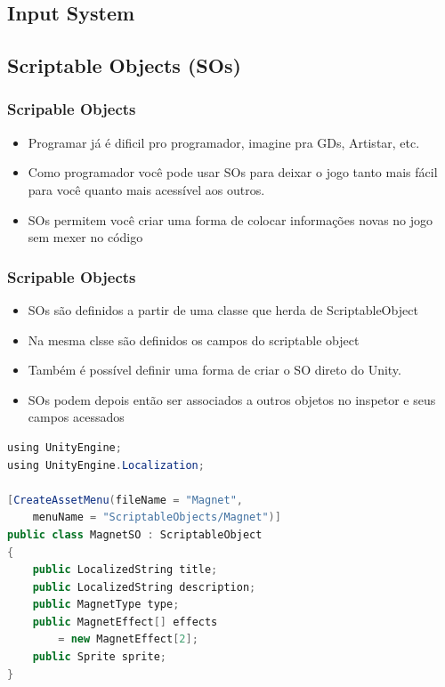 \documentclass{beamer}
\begin{document}
	\subsection{Input System}

	\subsection{Scriptable Objects (SOs)}
	\begin{frame}
		\frametitle{Scripable Objects}

		\begin{itemize}
			\item Programar já é dificil pro programador, imagine pra GDs,
				Artistar, etc.

			\item Como programador você pode usar SOs para deixar o jogo tanto
				mais fácil para você quanto mais acessível aos outros.

			\item SOs permitem você criar uma forma de colocar informações
				novas no jogo sem mexer no código

		\end{itemize}
	\end{frame}

	\begin{frame}
		\frametitle{Scripable Objects}

		\begin{itemize}
			\item SOs são definidos a partir de uma classe que herda de
				ScriptableObject

			\item Na mesma clsse são definidos os campos do scriptable object

			\item Também é possível definir uma forma de criar o SO direto do
				Unity.

			\item SOs podem depois então ser associados a outros objetos no
				inspetor e seus campos acessados

		\end{itemize}
	\end{frame}

	\begin{frame}[fragile]
		\begin{lstlisting}[language=Java,basicstyle=\ttfamily,keywordstyle=\color{blue}]
using UnityEngine;
using UnityEngine.Localization;

[CreateAssetMenu(fileName = "Magnet",
	menuName = "ScriptableObjects/Magnet")]
public class MagnetSO : ScriptableObject
{
	public LocalizedString title;
	public LocalizedString description;
	public MagnetType type;
	public MagnetEffect[] effects
		= new MagnetEffect[2];
	public Sprite sprite;
}
		\end{lstlisting}
	\end{frame}
\end{document}
